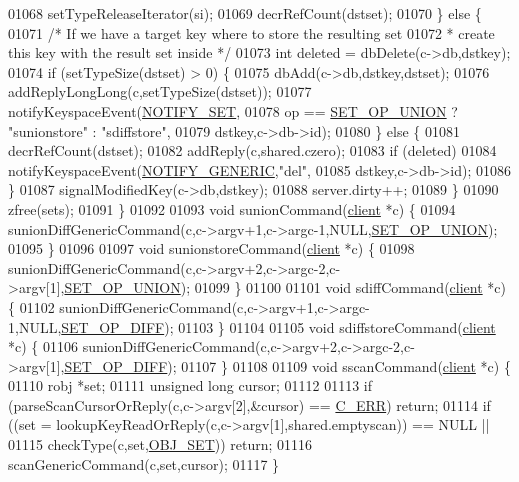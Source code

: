 \begin{DoxyCode}
01068         setTypeReleaseIterator(si);
01069         decrRefCount(dstset);
01070     \} \textcolor{keywordflow}{else} \{
01071         \textcolor{comment}{/* If we have a target key where to store the resulting set}
01072 \textcolor{comment}{         * create this key with the result set inside */}
01073         \textcolor{keywordtype}{int} deleted = dbDelete(c->db,dstkey);
01074         \textcolor{keywordflow}{if} (setTypeSize(dstset) > 0) \{
01075             dbAdd(c->db,dstkey,dstset);
01076             addReplyLongLong(c,setTypeSize(dstset));
01077             notifyKeyspaceEvent(\hyperlink{server_8h_a625aec945b2152a46979b1b21f2af274}{NOTIFY\_SET},
01078                 op == \hyperlink{server_8h_af00a414b6d78bff8b325eb9cf82c3edb}{SET\_OP\_UNION} ? \textcolor{stringliteral}{"sunionstore"} : \textcolor{stringliteral}{"sdiffstore"},
01079                 dstkey,c->db->id);
01080         \} \textcolor{keywordflow}{else} \{
01081             decrRefCount(dstset);
01082             addReply(c,shared.czero);
01083             \textcolor{keywordflow}{if} (deleted)
01084                 notifyKeyspaceEvent(\hyperlink{server_8h_a9fa53dd1068e62365f3964ad3479eec2}{NOTIFY\_GENERIC},\textcolor{stringliteral}{"del"},
01085                     dstkey,c->db->id);
01086         \}
01087         signalModifiedKey(c->db,dstkey);
01088         server.dirty++;
01089     \}
01090     zfree(sets);
01091 \}
01092 
01093 \textcolor{keywordtype}{void} sunionCommand(\hyperlink{structclient}{client} *c) \{
01094     sunionDiffGenericCommand(c,c->argv+1,c->argc-1,NULL,\hyperlink{server_8h_af00a414b6d78bff8b325eb9cf82c3edb}{SET\_OP\_UNION});
01095 \}
01096 
01097 \textcolor{keywordtype}{void} sunionstoreCommand(\hyperlink{structclient}{client} *c) \{
01098     sunionDiffGenericCommand(c,c->argv+2,c->argc-2,c->argv[1],\hyperlink{server_8h_af00a414b6d78bff8b325eb9cf82c3edb}{SET\_OP\_UNION});
01099 \}
01100 
01101 \textcolor{keywordtype}{void} sdiffCommand(\hyperlink{structclient}{client} *c) \{
01102     sunionDiffGenericCommand(c,c->argv+1,c->argc-1,NULL,\hyperlink{server_8h_ad22703ffec4b7bf6cd262099917dc6a1}{SET\_OP\_DIFF});
01103 \}
01104 
01105 \textcolor{keywordtype}{void} sdiffstoreCommand(\hyperlink{structclient}{client} *c) \{
01106     sunionDiffGenericCommand(c,c->argv+2,c->argc-2,c->argv[1],\hyperlink{server_8h_ad22703ffec4b7bf6cd262099917dc6a1}{SET\_OP\_DIFF});
01107 \}
01108 
01109 \textcolor{keywordtype}{void} sscanCommand(\hyperlink{structclient}{client} *c) \{
01110     robj *set;
01111     \textcolor{keywordtype}{unsigned} \textcolor{keywordtype}{long} cursor;
01112 
01113     \textcolor{keywordflow}{if} (parseScanCursorOrReply(c,c->argv[2],&cursor) == \hyperlink{server_8h_af98ac28d5f4d23d7ed5985188e6fb7d1}{C\_ERR}) \textcolor{keywordflow}{return};
01114     \textcolor{keywordflow}{if} ((set = lookupKeyReadOrReply(c,c->argv[1],shared.emptyscan)) == NULL ||
01115         checkType(c,set,\hyperlink{server_8h_a8d179375a4aac33d3fa7aa80c8ccc75f}{OBJ\_SET})) \textcolor{keywordflow}{return};
01116     scanGenericCommand(c,set,cursor);
01117 \}
\end{DoxyCode}
